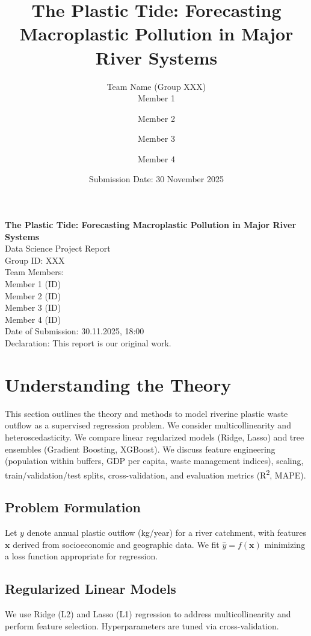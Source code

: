 \documentclass[11pt,a4paper]{article}
\title{The Plastic Tide: Forecasting Macroplastic Pollution in Major River Systems}
\author{Team Name (Group XXX)\\ Member 1 \and Member 2 \and Member 3 \and Member 4}
\date{Submission Date: 30 November 2025}
\begin{document}
\begin{titlepage}
    \centering
    {\Huge \bfseries The Plastic Tide: Forecasting Macroplastic Pollution in Major River Systems\\[1.5ex]}
    \vspace{1cm}
    {\Large Data Science Project Report}\\[1cm]
    {\large Group ID: XXX}\\[0.5cm]

    {\large Team Members:}\\
    {Member 1 (ID)\\ Member 2 (ID)\\ Member 3 (ID)\\ Member 4 (ID)}\\[1cm]

    {\large Date of Submission: 30.11.2025, 18:00}\\[2cm]

    \vfill
    {\large Declaration: This report is our original work.}
\end{titlepage}

\tableofcontents
\newpage

\section{Understanding the Theory}
\label{sec:theory}
This section outlines the theory and methods to model riverine plastic waste outflow as a supervised regression problem. We consider multicollinearity and heteroscedasticity. We compare linear regularized models (Ridge, Lasso) and tree ensembles (Gradient Boosting, XGBoost). We discuss feature engineering (population within buffers, GDP per capita, waste management indices), scaling, train/validation/test splits, cross-validation, and evaluation metrics (R\textsuperscript{2}, MAPE).

\subsection{Problem Formulation}
Let $y$ denote annual plastic outflow (kg/year) for a river catchment, with features $\mathbf{x}$ derived from socioeconomic and geographic data. We fit $\hat{y} = f(\mathbf{x})$ minimizing a loss function appropriate for regression.

\subsection{Regularized Linear Models}
We use Ridge (L2) and Lasso (L1) regression to address multicollinearity and perform feature selection. Hyperparameters are tuned via cross-validation.
\end{document}
